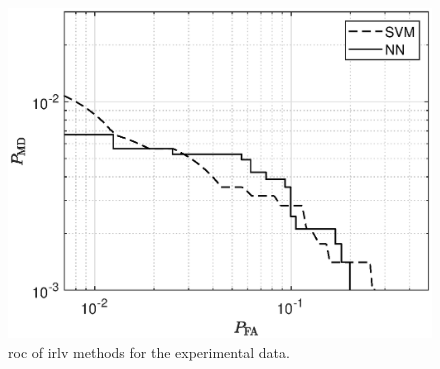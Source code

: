 \documentclass[draftcls,onecolumn,12pt]{IEEEtran}
\begin{document}



\begin{figure}[t]
    \centering
    \includegraphics[width=0.6\columnwidth]{berlinNew.eps}
    \caption{\ac{roc} of \ac{irlv} methods for the experimental data.}
    \label{fig:Berlinnew}
\end{figure}
\end{document}
